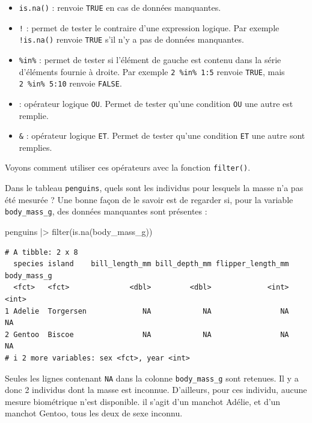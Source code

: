 \documentclass[
  a4paper,
  DIV=11,
  numbers=noendperiod,
  oneside]{scrreprt}
\newenvironment{Shaded}{}{}
\newcommand{\FunctionTok}[1]{\textcolor[rgb]{0.44,0.26,0.76}{#1}}
\newcommand{\NormalTok}[1]{\textcolor[rgb]{0.14,0.16,0.18}{#1}}
\newcommand{\SpecialCharTok}[1]{\textcolor[rgb]{0.00,0.36,0.77}{#1}}
\providecommand{\tightlist}{%
  \setlength{\itemsep}{0pt}\setlength{\parskip}{0pt}}\usepackage{longtable,booktabs,array}
\begin{document}
\begin{itemize}
\tightlist
\item
  \texttt{is.na()} : renvoie \texttt{TRUE} en cas de données manquantes.
\item
  \texttt{!} : permet de tester le contraire d'une expression logique.
  Par exemple \texttt{!is.na()} renvoie \texttt{TRUE} s'il n'y a pas de
  données manquantes.
\item
  \texttt{\%in\%} : permet de tester si l'élément de gauche est contenu
  dans la série d'éléments fournie à droite. Par exemple
  \texttt{2\ \%in\%\ 1:5} renvoie \texttt{TRUE}, mais
  \texttt{2\ \%in\%\ 5:10} renvoie \texttt{FALSE}.
\item
  \texttt{\textbar{}} : opérateur logique \texttt{OU}. Permet de tester
  qu'une condition \texttt{OU} une autre est remplie.
\item
  \texttt{\&} : opérateur logique \texttt{ET}. Permet de tester qu'une
  condition \texttt{ET} une autre sont remplies.
\end{itemize}

Voyons comment utiliser ces opérateurs avec la fonction
\texttt{filter()}.

Dans le tableau \texttt{penguins}, quels sont les individus pour
lesquels la masse n'a pas été mesurée ? Une bonne façon de le savoir est
de regarder si, pour la variable \texttt{body\_mass\_g}, des données
manquantes sont présentes :

\begin{Shaded}
\begin{Highlighting}[]
\NormalTok{penguins }\SpecialCharTok{|\textgreater{}} 
  \FunctionTok{filter}\NormalTok{(}\FunctionTok{is.na}\NormalTok{(body\_mass\_g))}
\end{Highlighting}
\end{Shaded}

\begin{verbatim}
# A tibble: 2 x 8
  species island    bill_length_mm bill_depth_mm flipper_length_mm body_mass_g
  <fct>   <fct>              <dbl>         <dbl>             <int>       <int>
1 Adelie  Torgersen             NA            NA                NA          NA
2 Gentoo  Biscoe                NA            NA                NA          NA
# i 2 more variables: sex <fct>, year <int>
\end{verbatim}

Seules les lignes contenant \texttt{NA} dans la colonne
\texttt{body\_mass\_g} sont retenues. Il y a donc 2 individus dont la
masse est inconnue. D'ailleurs, pour ces individu, aucune mesure
biométrique n'est disponible. il s'agit d'un manchot Adélie, et d'un
manchot Gentoo, tous les deux de sexe inconnu.
\end{document}
